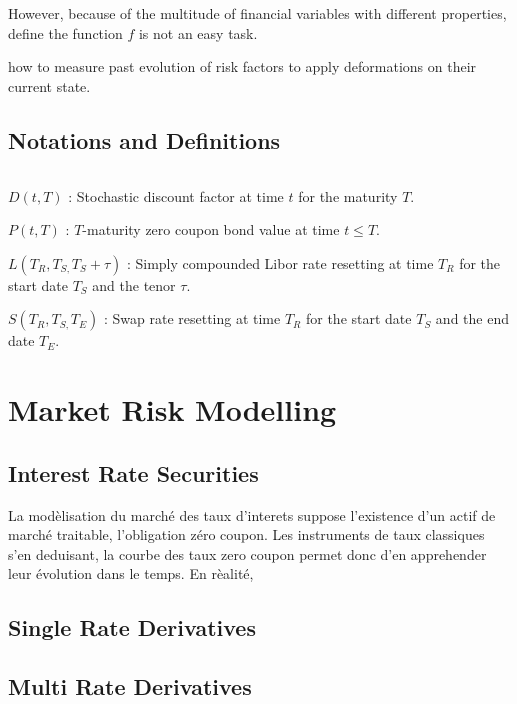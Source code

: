 \documentclass[3pt]{article}
\begin{document}
\bigskip

However, because of the multitude of financial variables with different
properties, define the function $f$ is not an easy task.

\bigskip

how to measure past evolution of risk factors to apply deformations on their
current state.

\subsection{Notations and Definitions}

$\ \ \ \ \ $

$D(t,T)$ : Stochastic discount factor at time $t$ for the maturity $T$.

\bigskip

$P(t,T)$ : $T$-maturity zero coupon bond value at time $t\leq T$.

\bigskip

$L(T_{R},T_{S,}T_{S}+\tau )$ : Simply compounded Libor rate resetting at
time $T_{R}$ for the start date $T_{S}$ and the tenor $\tau $.

\bigskip

$S(T_{R},T_{S,}T_{E})$ : Swap rate resetting at time $T_{R}$ for the start
date $T_{S}$ and the end date $T_{E}$.

\bigskip

\section{Market Risk Modelling}

\subsection{Interest Rate Securities}

\bigskip La mod\`{e}lisation du march\'{e} des taux d'interets suppose
l'existence d'un actif de march\'{e} traitable, l'obligation z\'{e}ro
coupon. Les instruments de taux classiques s'en deduisant, la courbe des
taux zero coupon permet donc d'en apprehender leur \'{e}volution dans le
temps. En r\`{e}alit\'{e},

\bigskip

\subsection{Single Rate Derivatives}

\subsection{Multi Rate Derivatives}
\end{document}
